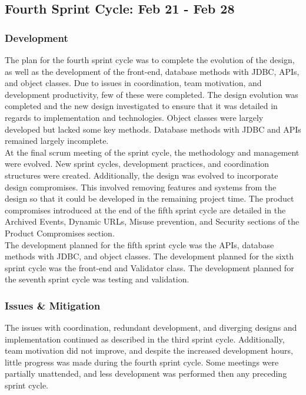 \documentclass[9pt, titlepage]{extarticle}
\begin{document}
\subsection{Fourth Sprint Cycle: Feb 21 - Feb 28}

\subsubsection{Development}

The plan for the fourth sprint cycle was to complete the evolution of the design, as well as the development of the front-end, database methods with JDBC, APIs, and object classes. Due to issues in coordination, team motivation, and development productivity, few of these were completed. The design evolution was completed and the new design investigated to ensure that it was detailed in regards to implementation and technologies. Object classes were largely developed but lacked some key methods. Database methods with JDBC and APIs remained largely incomplete.\\

At the final scrum meeting of the sprint cycle, the methodology and management were evolved. New sprint cycles, development practices, and coordination structures were created. Additionally, the design was evolved to incorporate design compromises. This involved removing features and systems from the design so that it could be developed in the remaining project time. The product compromises introduced at the end of the fifth sprint cycle are detailed in the Archived Events, Dynamic URLs, Misuse prevention, and Security sections of the Product Compromises section.\\

The development planned for the fifth sprint cycle was the APIs, database methods with JDBC, and object classes. The development planned for the sixth sprint cycle was the front-end and Validator class. The development planned for the seventh sprint cycle was testing and validation.

\subsubsection{Issues \& Mitigation}

The issues with coordination, redundant development, and diverging designs and implementation continued as described in the third sprint cycle. Additionally, team motivation did not improve, and despite the increased development hours, little progress was made during the fourth sprint cycle. Some meetings were partially unattended, and less development was performed then any preceding sprint cycle.\\
\end{document}
